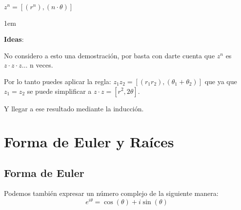 \documentclass[12pt, fleqn]{report}                             %
\newenvironment{SmallIndentation}[1][0.75em]                    %
    {\begin{adjustwidth}{#1}{}\begin{footnotesize}}                 %
    {\end{footnotesize}\end{adjustwidth}}                           %
\newcommand{\Wrap}[1]{\left( #1 \right)}                        %
\newcommand{\Cos}[1]{\cos\Wrap{#1}}                             %
\newcommand{\Sin}[1]{\sin\Wrap{#1}}                             %
\begin{document}
\begin{itemize}
                    $z^n = [(r^n), (n \cdot \theta)]$

                    \begin{SmallIndentation}[1em]
                        \textbf{Ideas}:

                        No considero a esto una demostración, por basta con darte cuenta que
                        $z^n$ es $z \cdot z \cdot z \dots$ n veces.

                        Por lo tanto puedes aplicar la regla: $z_1z_2 = [(r_1r_2), (\theta_1 + \theta_2)]$
                        que ya que $z_1 = z_2$ se puede simplificar a $z \cdot z = [r^2, 2\theta]$.

                        Y llegar a ese resultado mediante la inducción.

                    \end{SmallIndentation}

            \clearpage
            

            \end{itemize}



    \chapter{Forma de Euler y Raíces}


        \clearpage
        \section{Forma de Euler}  

            Podemos también expresar un número complejo de la siguiente manera:
            \begin{equation}
                e^{i\theta} = \Cos{\theta} + i\Sin{\theta}
            \end{equation}
\end{document}
